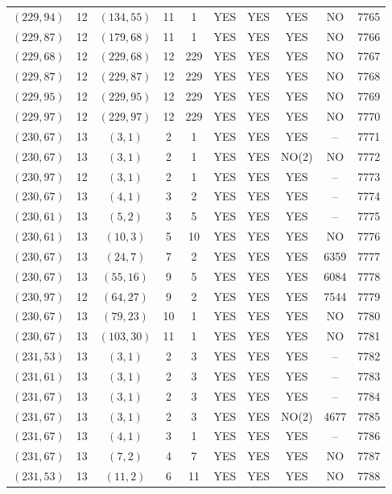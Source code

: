 \begin{longtable}{|c|c|c|c|c|c|c|c|c|c|}
$(229, 94)$ & 12 & $(134, 55)$ & 11 & 1 & YES & YES & YES & NO & 7765\\
$(229, 87)$ & 12 & $(179, 68)$ & 11 & 1 & YES & YES & YES & NO & 7766\\
$(229, 68)$ & 12 & $(229, 68)$ & 12 & 229 & YES & YES & YES & NO & 7767\\
$(229, 87)$ & 12 & $(229, 87)$ & 12 & 229 & YES & YES & YES & NO & 7768\\
$(229, 95)$ & 12 & $(229, 95)$ & 12 & 229 & YES & YES & YES & NO & 7769\\
$(229, 97)$ & 12 & $(229, 97)$ & 12 & 229 & YES & YES & YES & NO & 7770\\
$(230, 67)$ & 13 & $(3, 1)$ & 2 & 1 & YES & YES & YES & -- & 7771\\
$(230, 67)$ & 13 & $(3, 1)$ & 2 & 1 & YES & YES & NO(2) & NO & 7772\\
$(230, 97)$ & 12 & $(3, 1)$ & 2 & 1 & YES & YES & YES & -- & 7773\\
$(230, 67)$ & 13 & $(4, 1)$ & 3 & 2 & YES & YES & YES & -- & 7774\\
$(230, 61)$ & 13 & $(5, 2)$ & 3 & 5 & YES & YES & YES & -- & 7775\\
$(230, 61)$ & 13 & $(10, 3)$ & 5 & 10 & YES & YES & YES & NO & 7776\\
$(230, 67)$ & 13 & $(24, 7)$ & 7 & 2 & YES & YES & YES & 6359 & 7777\\
$(230, 67)$ & 13 & $(55, 16)$ & 9 & 5 & YES & YES & YES & 6084 & 7778\\
$(230, 97)$ & 12 & $(64, 27)$ & 9 & 2 & YES & YES & YES & 7544 & 7779\\
$(230, 67)$ & 13 & $(79, 23)$ & 10 & 1 & YES & YES & YES & NO & 7780\\
$(230, 67)$ & 13 & $(103, 30)$ & 11 & 1 & YES & YES & YES & NO & 7781\\
$(231, 53)$ & 13 & $(3, 1)$ & 2 & 3 & YES & YES & YES & -- & 7782\\
$(231, 61)$ & 13 & $(3, 1)$ & 2 & 3 & YES & YES & YES & -- & 7783\\
$(231, 67)$ & 13 & $(3, 1)$ & 2 & 3 & YES & YES & YES & -- & 7784\\
$(231, 67)$ & 13 & $(3, 1)$ & 2 & 3 & YES & YES & NO(2) & 4677 & 7785\\
$(231, 67)$ & 13 & $(4, 1)$ & 3 & 1 & YES & YES & YES & -- & 7786\\
$(231, 67)$ & 13 & $(7, 2)$ & 4 & 7 & YES & YES & YES & NO & 7787\\
$(231, 53)$ & 13 & $(11, 2)$ & 6 & 11 & YES & YES & YES & NO & 7788\\

\end{longtable}

